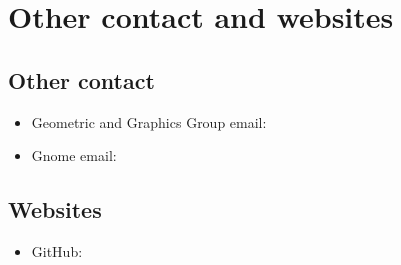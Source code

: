 \section{Other contact and websites}

    \subsection{Other contact}
        \begin{indentpar}{72pt}
            \begin{itemize}
                \item Geometric and Graphics Group email: 
                \item Gnome email: 
            \end{itemize}           
        \end{indentpar}
        
    \subsection{Websites}
        \begin{indentpar}{72pt}
            \begin{itemize}
                \item GitHub: 
            \end{itemize}            
        \end{indentpar}



